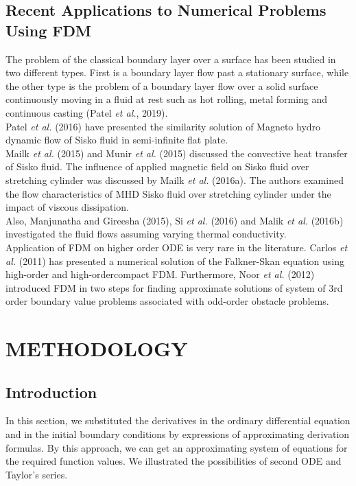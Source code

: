 \documentclass[12pt]{report}
\newcommand{\NI}{\noindent}
\begin{document}
	
	
	\section{Recent Applications to Numerical Problems Using FDM}
	The problem of the classical boundary layer over a surface has been studied in two different types. First is a boundary layer flow past a stationary surface, while the other type is the problem of a boundary layer flow over a solid surface continuously moving in a fluid at rest such as hot rolling,
	metal forming and continuous casting (Patel \textit{et al.}, 2019).\\
	
	\NI Patel \textit{et al.} (2016) have presented the similarity solution of Magneto hydro dynamic flow of Sisko fluid in semi-infinite flat plate.\\
	
	\NI Mailk \textit{et al.} (2015) and Munir \textit{et al.} (2015) discussed the convective heat transfer of Sisko fluid. The influence of applied magnetic field on Sisko fluid over stretching cylinder was discussed by Mailk \textit{et al.} (2016a). The authors examined the flow characteristics of MHD Sisko fluid over stretching cylinder under the impact of viscous dissipation.\\
	
	\NI Also, Manjunatha and Gireesha (2015), Si \textit{et al.} (2016) and Malik \textit{et al.} (2016b) investigated the fluid flows assuming varying thermal conductivity.\\
	
	\NI Application of FDM on higher order ODE is very rare in the literature. Carlos \textit{et al.} (2011) has presented a numerical solution of the Falkner-Skan equation using high-order and high-ordercompact FDM. Furthermore, Noor \textit{et al.} (2012) introduced FDM in two steps for finding approximate solutions of system of 3rd order boundary value problems associated with odd-order obstacle problems.
	

	\chapter{METHODOLOGY}
	\section{Introduction}
	In this section, we substituted the derivatives in the ordinary differential equation and in the initial boundary conditions by expressions of approximating derivation formulas. By this approach, we can get an approximating system of equations for the required function values. We illustrated the possibilities of second ODE and Taylor’s series.
	
\end{document}
